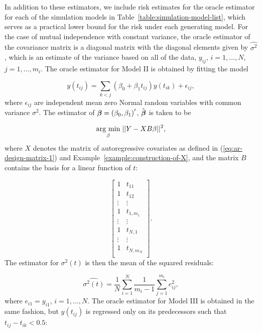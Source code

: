 \bigskip

In addition to these estimators, we include risk estimates for the oracle estimator for each of the simulation models in Table~\ref{table:simulation-model-list}, which serves as a practical lower bound for the risk under each generating model. For the case of mutual independence with constant variance, the oracle estimator of the covariance matrix is a diagonal matrix with the diagonal elements given by $\hat{\sigma^2}$, which is an estimate of the variance based on all of the data, $y_{ij}$, $i = 1,\dots, N$, $j = 1,\dots, m_i$. The oracle estimator for Model II is obtained by fitting the model

\begin{equation} \label{eq:model-2-oracle-model}
y\left(t_{ij}\right) = \sum_{k < j} \left(\beta_0 + \beta_1 t_{ij}\right) y\left( t_{ik} \right) + \epsilon_{ij},
\end{equation}
\noindent 
where $\epsilon_{ij}$ are independent mean zero Normal random variables with common variance $\sigma^2$. The estimator of $\mbox{\boldmath $\beta$} = \left(\beta_0, \beta_1\right)'$, $\hat{\mbox{\boldmath $\beta$}}$ is taken to be 

\begin{equation}\label{eq:model-2-oracle-estimator}
\underset{\beta}{\operatorname{arg}\,\operatorname{min}}\; \vert \vert Y - X B \beta \vert \vert^2, 
\end{equation}
\noindent
where $X$ denotes the matrix of autoregressive covariates as defined in (\ref{eq:ar-design-matrix-1}) and Example~\ref{example:construction-of-X}, and the matrix $B$ contains the basis for a linear function of $t$:

\[
\begin{bmatrix}
1 & t_{11} \\
1 & t_{12} \\
\vdots & \vdots \\
1 & t_{1,m_1} \\
\vdots & \vdots \\
1 & t_{N,1} \\
\vdots & \vdots \\
1 & t_{N,m_N} \\
\end{bmatrix}.
\]
\noindent
The estimator for $\sigma^2\left(t\right)$ is then the mean of the squared residuals:

\[
\hat{\sigma^2\left( t \right)} = \frac{1}{N}\sum_{i = 1}^N\frac{1}{m_i - 1} \sum_{j = 1}^{m_i} e_{ij}^2,
\]
\noindent
where $e_{i1} = y_{i1}$, $i = 1,\dots, N$. The oracle estimator for Model III is obtained in the same fashion, but $y\left(t_{ij}\right)$ is regressed only on its predecessors such that $t_{ij} - t_{ik} < 0.5$:

